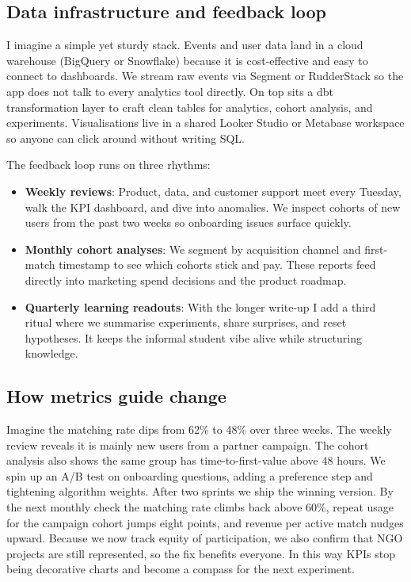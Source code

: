 \subsection*{Data infrastructure and feedback loop}
I imagine a simple yet sturdy stack. Events and user data land in a cloud warehouse (BigQuery or Snowflake) because it is cost-effective and easy to connect to dashboards. We stream raw events via Segment or RudderStack so the app does not talk to every analytics tool directly. On top sits a dbt transformation layer to craft clean tables for analytics, cohort analysis, and experiments. Visualisations live in a shared Looker Studio or Metabase workspace so anyone can click around without writing SQL.

The feedback loop runs on three rhythms:
\begin{itemize}
    \item \textbf{Weekly reviews}: Product, data, and customer support meet every Tuesday, walk the KPI dashboard, and dive into anomalies. We inspect cohorts of new users from the past two weeks so onboarding issues surface quickly.
    \item \textbf{Monthly cohort analyses}: We segment by acquisition channel and first-match timestamp to see which cohorts stick and pay. These reports feed directly into marketing spend decisions and the product roadmap.
    \item \textbf{Quarterly learning readouts}: With the longer write-up I add a third ritual where we summarise experiments, share surprises, and reset hypotheses. It keeps the informal student vibe alive while structuring knowledge.
\end{itemize}

\subsection*{How metrics guide change}
Imagine the matching rate dips from 62\% to 48\% over three weeks. The weekly review reveals it is mainly new users from a partner campaign. The cohort analysis also shows the same group has time-to-first-value above 48 hours. We spin up an A/B test on onboarding questions, adding a preference step and tightening algorithm weights. After two sprints we ship the winning version. By the next monthly check the matching rate climbs back above 60\%, repeat usage for the campaign cohort jumps eight points, and revenue per active match nudges upward. Because we now track equity of participation, we also confirm that NGO projects are still represented, so the fix benefits everyone. In this way KPIs stop being decorative charts and become a compass for the next experiment.

